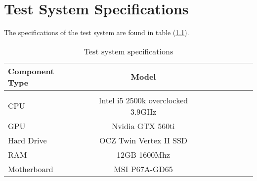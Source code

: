
\chapter{Test System Specifications}
\label{AppendixA}

The specifications of the test system are found in table (\ref{tab:testsystem}). 

\begin{table}[h!]
\begin{center}
\begin{tabular}{l*{6}{c}r}
Component Type            & Model  \\
\hline
\\
CPU & Intel i5 2500k overclocked \@ 3.9GHz \\
GPU & Nvidia GTX 560ti \\ 
Hard Drive & OCZ Twin Vertex II SSD \\
RAM & 12GB 1600Mhz \\
Motherboard & MSI P67A-GD65 \\
\end{tabular}

\caption{Test system specifications}
\label{tab:testsystem}
\end{center}
\end{table}